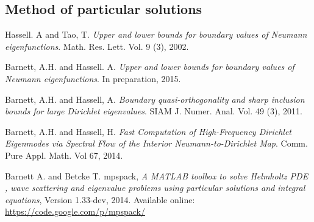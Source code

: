 \documentclass{article}
\begin{document}
\subsection{Method of particular solutions}

\begin{thebibliography}{9}

Hassell. A and Tao, T.
\textsl{Upper and lower bounds for boundary values of Neumann eigenfunctions}.
Math. Res. Lett. Vol. 9 (3), 2002. %

Barnett, A.H. and Hassell. A.
\textsl{Upper and lower bounds for boundary values of Neumann eigenfunctions}.
In preparation, 2015.

Barnett, A.H. and Hassell, A.
\textsl{Boundary quasi-orthogonality and sharp inclusion bounds for large Dirichlet eigenvalues}.
SIAM J. Numer. Anal. Vol. 49 (3), 2011.

Barnett, A.H. and Hassell, H.
\textsl{Fast Computation of High-Frequency Dirichlet Eigenmodes via Spectral Flow of the Interior Neumann-to-Dirichlet Map}.
Comm. Pure Appl. Math. Vol 67, 2014.

Barnett A. and Betcke T.
mpspack,
\textsl{A MATLAB toolbox to solve Helmholtz PDE , wave scattering and eigenvalue problems using particular solutions and integral equations},
Version 1.33-dev, 2014.
Available online: \url{https://code.google.com/p/mpspack/}

\end{thebibliography}
\end{document}
